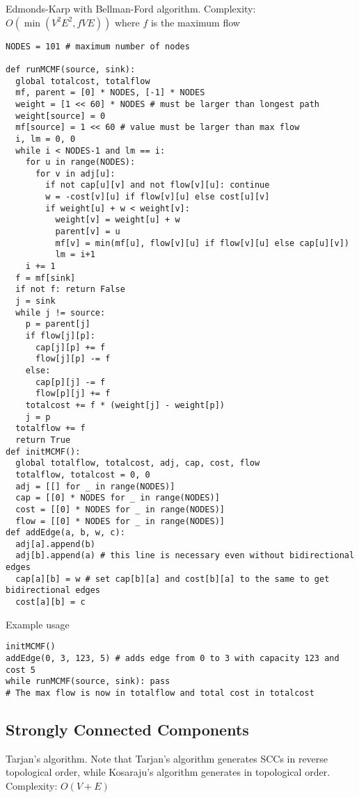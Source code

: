 \documentclass[letterpaper]{article}
\begin{document}
Edmonds-Karp with Bellman-Ford algorithm. Complexity: $O\left(\min\left(V^2E^2, fVE\right)\right)$ where $f$ is the maximum flow

\begin{lstlisting}
NODES = 101 # maximum number of nodes

def runMCMF(source, sink):
  global totalcost, totalflow
  mf, parent = [0] * NODES, [-1] * NODES
  weight = [1 << 60] * NODES # must be larger than longest path
  weight[source] = 0
  mf[source] = 1 << 60 # value must be larger than max flow
  i, lm = 0, 0
  while i < NODES-1 and lm == i:
    for u in range(NODES):
      for v in adj[u]:
        if not cap[u][v] and not flow[v][u]: continue
        w = -cost[v][u] if flow[v][u] else cost[u][v]
        if weight[u] + w < weight[v]:
          weight[v] = weight[u] + w
          parent[v] = u
          mf[v] = min(mf[u], flow[v][u] if flow[v][u] else cap[u][v])
          lm = i+1
    i += 1
  f = mf[sink]
  if not f: return False
  j = sink
  while j != source:
    p = parent[j]
    if flow[j][p]:
      cap[j][p] += f
      flow[j][p] -= f
    else:
      cap[p][j] -= f
      flow[p][j] += f
    totalcost += f * (weight[j] - weight[p])
    j = p
  totalflow += f
  return True
def initMCMF():
  global totalflow, totalcost, adj, cap, cost, flow
  totalflow, totalcost = 0, 0
  adj = [[] for _ in range(NODES)]
  cap = [[0] * NODES for _ in range(NODES)]
  cost = [[0] * NODES for _ in range(NODES)]
  flow = [[0] * NODES for _ in range(NODES)]
def addEdge(a, b, w, c):
  adj[a].append(b)
  adj[b].append(a) # this line is necessary even without bidirectional edges
  cap[a][b] = w # set cap[b][a] and cost[b][a] to the same to get bidirectional edges
  cost[a][b] = c
\end{lstlisting}
Example usage
\begin{lstlisting}
initMCMF()
addEdge(0, 3, 123, 5) # adds edge from 0 to 3 with capacity 123 and cost 5
while runMCMF(source, sink): pass
# The max flow is now in totalflow and total cost in totalcost
\end{lstlisting}

\clearpage

\subsection{Strongly Connected Components}

Tarjan's algorithm. Note that Tarjan's algorithm generates SCCs in reverse topological order, while Kosaraju's algorithm generates in topological order. Complexity: $O\left(V + E\right)$
\end{document}
